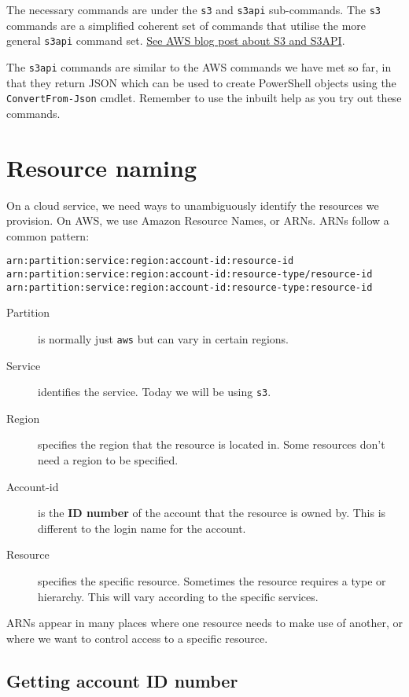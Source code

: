 The necessary commands are under the \texttt{s3} and \texttt{s3api} sub-commands.
The \texttt{s3} commands are a simplified coherent set of commands that utilise the more general \texttt{s3api} command set.
\href{https://aws.amazon.com/blogs/developer/leveraging-the-s3-and-s3api-commands/}{See AWS blog post about S3 and S3API}.

The \texttt{s3api} commands are similar to the AWS commands we have met so far, in that they return JSON which can be used to create PowerShell objects using the \texttt{ConvertFrom-Json} cmdlet.
Remember to use the inbuilt help as you try out these commands.


\section{Resource naming}\label{resource-naming}

On a cloud service, we need ways to unambiguously identify the resources
we provision. On AWS, we use Amazon Resource Names, or ARNs. ARNs follow
a common pattern:

\begin{verbatim}
arn:partition:service:region:account-id:resource-id
arn:partition:service:region:account-id:resource-type/resource-id
arn:partition:service:region:account-id:resource-type:resource-id
\end{verbatim}

\begin{description}
\item[Partition]
is normally just \texttt{aws} but can vary in certain regions.
\item[Service]
identifies the service. Today we will be using \texttt{s3}.
\item[Region]
specifies the region that the resource is located in. Some resources
don't need a region to be specified.
\item[Account-id]
is the \textbf{ID number} of the account that the resource is owned by.
This is different to the login name for the account.
\item[Resource]
specifies the specific resource. Sometimes the resource requires a type
or hierarchy. This will vary according to the specific services.
\end{description}

ARNs appear in many places where one resource needs to make use of
another, or where we want to control access to a specific resource.

\subsection{Getting account ID number}\label{getting-account-id-number}

